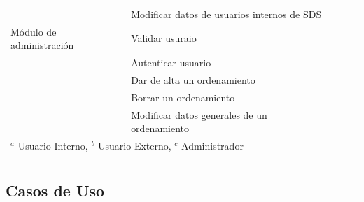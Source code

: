 \begin{longtable}{p{4cm} p{7cm} p{.5cm} p{.5cm} p{.5cm}}
 & Modificar datos de usuarios internos de SDS & & & \cellcolor{myotroazul}\\

Módulo de administración & Validar usuraio &  & & \cellcolor{myotroazul}\\

 & Autenticar usuario & & & \cellcolor{myotroazul}\\

 & Dar de alta un ordenamiento & & & \cellcolor{myotroazul}\\

 & Borrar un ordenamiento & & & \cellcolor{myotroazul}\\

 & Modificar datos generales de un ordenamiento & & & \cellcolor{myotroazul}\\
\hline
\multicolumn{5}{l}{\small{$^a$ Usuario Interno, $^b$ Usuario Externo, $^c$ Administrador}}\\

  \\
\end{longtable}
\endgroup
\pagebreak
\subsection{Casos de Uso}






